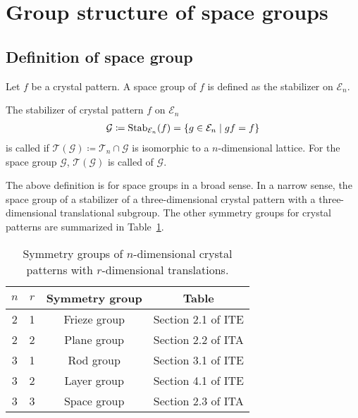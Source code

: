 \section{\label{sec:group_structure}Group structure of space groups}

\subsection{\label{sec:def_space_group}Definition of space group}

Let $f$ be a crystal pattern.
A space group of $f$ is defined as the stabilizer on $\mathcal{E}_{n}$.

\begin{screen}
  \begin{defn}
    The stabilizer of crystal pattern $f$ on $\mathcal{E}_{n}$
    \begin{align}
      \mathcal{G} \coloneqq \mathrm{Stab}_{\mathcal{E}_{n}} (f) = \left\{  g \in \mathcal{E}_{n}  \mathrel{}\middle|\mathrel{}  g f = f  \right\}
    \end{align}
    is called  if $\mathcal{T}(\mathcal{G}) \coloneqq \mathcal{T}_{n} \cap \mathcal{G}$ is isomorphic to a $n$-dimensional lattice.
    For the space group $\mathcal{G}$, $\mathcal{T}(\mathcal{G})$ is called  of $\mathcal{G}$.
  \end{defn}
\end{screen}

The above definition is for space groups in a broad sense.
In a narrow sense, the space group of a stabilizer of a three-dimensional crystal pattern with a three-dimensional translational subgroup.
The other symmetry groups for crystal patterns are summarized in Table~\ref{tab:symmetry_groups}.

\begin{table}[htb]
  \centering
  \caption{Symmetry groups of $n$-dimensional crystal patterns with $r$-dimensional translations.}
  \label{tab:symmetry_groups}
  \begin{tabular}[h]{cccc}
    \hline\hline
    $n$ & $r$ & Symmetry group & Table \\
    \hline
    2 & 1 & Frieze group & Section 2.1 of ITE \cite{ITE2010} \\
    2 & 2 & Plane group  & Section 2.2 of ITA \cite{ITA2016} \\
    3 & 1 & Rod group    & Section 3.1 of ITE \cite{ITE2010} \\
    3 & 2 & Layer group  & Section 4.1 of ITE \cite{ITE2010} \\
    3 & 3 & Space group  & Section 2.3 of ITA \cite{ITA2016} \\
    \hline\hline
  \end{tabular}
\end{table}

